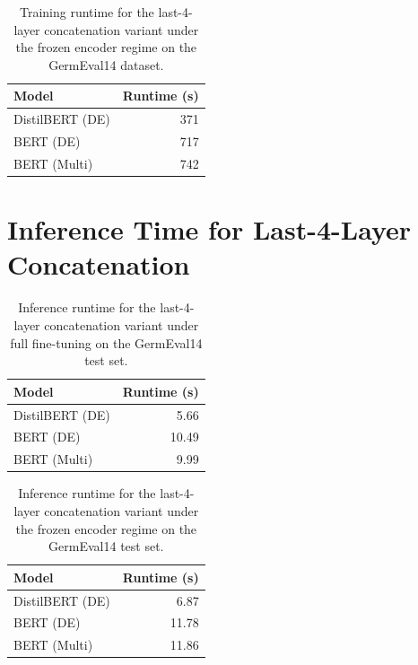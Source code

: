 \documentclass[11pt,a4paper,twocolumn]{article}
\begin{document}
\begin{table}[h]
    \centering
    \begin{tabular}{lr}
        \toprule
        \textbf{Model} & \textbf{Runtime (s)} \\
        \midrule
        DistilBERT (DE) & 371 \\
        BERT (DE)       & 717 \\
        BERT (Multi)    & 742 \\
        \bottomrule
    \end{tabular}
    \caption{Training runtime for the last-4-layer concatenation variant under the frozen encoder regime on the GermEval14 dataset.}
    \label{tab:last4-train-frozen}
\end{table}
\FloatBarrier
\section{Inference Time for Last-4-Layer Concatenation}
\label{app:Inference-Time-Last4}
\begin{table}[h]
    \centering
    \begin{tabular}{lr}
        \toprule
        \textbf{Model} & \textbf{Runtime (s)} \\
        \midrule
        DistilBERT (DE) & 5.66 \\
        BERT (DE)       & 10.49 \\
        BERT (Multi)    & 9.99 \\
        \bottomrule
    \end{tabular}
    \caption{Inference runtime for the last-4-layer concatenation variant under full fine-tuning on the GermEval14 test set.}
    \label{tab:last4-infer-full}
\end{table}

\begin{table}[h]
    \centering
    \begin{tabular}{lr}
        \toprule
        \textbf{Model} & \textbf{Runtime (s)} \\
        \midrule
        DistilBERT (DE) & 6.87 \\
        BERT (DE)       & 11.78 \\
        BERT (Multi)    & 11.86 \\
        \bottomrule
    \end{tabular}
    \caption{Inference runtime for the last-4-layer concatenation variant under the frozen encoder regime on the GermEval14 test set.}
    \label{tab:last4-infer-frozen}
\end{table}
\end{document}
